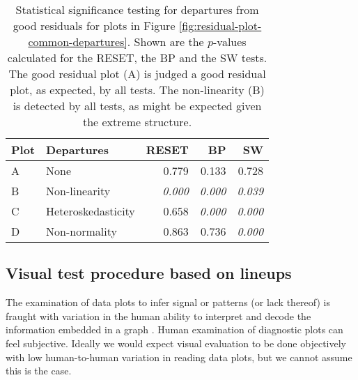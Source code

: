 \documentclass[]{interact}
\theoremstyle{plain}%
\theoremstyle{definition}
\theoremstyle{remark}
\begin{document}
\begin{table}

\caption{\label{tab:example-residual-plot-table}Statistical significance testing for departures from good residuals for plots in Figure \ref{fig:residual-plot-common-departures}. Shown are the $p$-values calculated for the RESET, the BP and the SW tests. The good residual plot (A) is judged a good residual plot, as expected, by all tests. The non-linearity (B) is detected by all tests, as might be expected given the extreme structure.}
\centering
\begin{tabular}[t]{llrrr}
\toprule
Plot & Departures & RESET & BP & SW\\
\midrule
A & None & 0.779 & 0.133 & 0.728\\
B & Non-linearity & \em{0.000} & \em{0.000} & \em{0.039}\\
C & Heteroskedasticity & 0.658 & \em{0.000} & \em{0.000}\\
D & Non-normality & 0.863 & 0.736 & \em{0.000}\\
\bottomrule
\end{tabular}
\end{table}

\hypertarget{visual-test-procedure-based-on-lineups}{%
\subsection{Visual test procedure based on
lineups}\label{visual-test-procedure-based-on-lineups}}

The examination of data plots to infer signal or patterns (or lack
thereof) is fraught with variation in the human ability to interpret and
decode the information embedded in a graph
\citep{cleveland1984graphical}. Human examination of diagnostic plots
can feel subjective. Ideally we would expect visual evaluation to be
done objectively with low human-to-human variation in reading data
plots, but we cannot assume this is the case.
\end{document}
